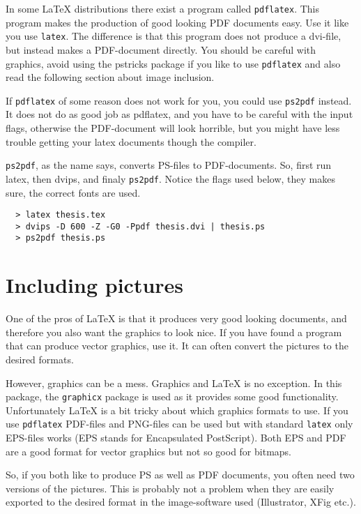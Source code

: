 \documentclass[a4paper,11pt,oneside]{report}
\begin{document}
In some LaTeX distributions there exist a program called
\texttt{pdflatex}. This program makes the production of good looking PDF
documents easy. Use it like you use \texttt{latex}. The difference is that
this program does not produce a dvi-file, but instead makes a
PDF-document directly. You should be careful with graphics, avoid
using the pstricks package if you like to use \texttt{pdflatex} and also
read the following section about image inclusion.

If \texttt{pdflatex} of some reason does not work for you, you could use
\texttt{ps2pdf} instead. It does not do as good job as pdflatex, and you have to
be careful with the input flags, otherwise the PDF-document will look horrible,
but you might have less trouble getting your latex documents though the
compiler.

\texttt{ps2pdf}, as the name says, converts PS-files to PDF-documents. So, first
run latex, then dvips, and finaly \texttt{ps2pdf}. Notice the flags used below,
they makes sure, the correct fonts are used.
\begin{verbatim}
  > latex thesis.tex
  > dvips -D 600 -Z -G0 -Ppdf thesis.dvi | thesis.ps
  > ps2pdf thesis.ps
\end{verbatim}

\section{Including pictures}

One of the pros of {\LaTeX} is that it produces very good looking
documents, and therefore you also want the graphics to look nice. If
you have found a program that can produce vector graphics, use
it. It can often convert the pictures to the desired formats.

However, graphics can be a mess. Graphics and {\LaTeX} is no
exception. In this package, the \texttt{graphicx} package is used
as it provides some good functionality. Unfortunately {\LaTeX} is a bit
tricky about which graphics  formats to use. If you use
\texttt{pdflatex} PDF-files and PNG-files can be used but with
standard \texttt{latex} only EPS-files works (EPS stands for
Encapsulated PostScript). Both EPS and PDF are a good format for
vector graphics but not so good for bitmaps.

So, if you both like to produce PS as well as PDF documents, you
often need two versions of the pictures. This is probably not a
problem when they are easily exported to the desired format in the
image-software used (Illustrator, XFig etc.).
\end{document}
